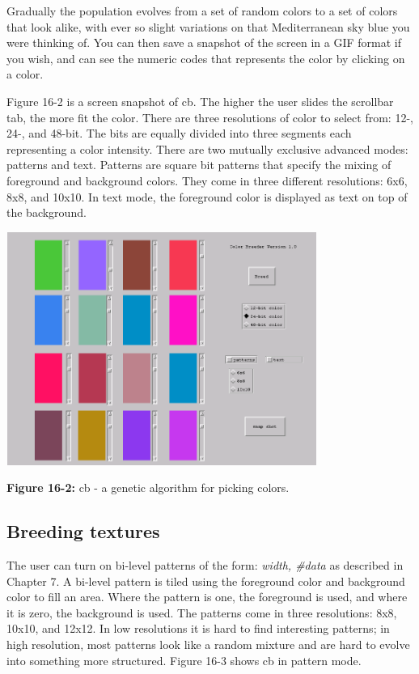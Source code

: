 Gradually the population evolves from a set of random colors to a set of
colors that look alike, with ever so slight variations on that
Mediterranean sky blue you were thinking of. You can then save a
snapshot of the screen in a GIF format if you wish, and can see the
numeric codes that represents the color by clicking on a color.

Figure 16-2 is a screen snapshot of \textsf{cb}. The higher the user
slides the scrollbar tab, the more fit the color. There are three
resolutions of color to select from: 12-, 24-, and 48-bit.
The bits are equally divided into three segments each representing a
color intensity. There are two mutually exclusive advanced modes:
patterns and text. Patterns are square bit patterns that specify the
mixing of foreground and background colors. They come in three
different resolutions: 6x6, 8x8, and 10x10. In text mode, the
foreground color is displayed as text on top of the background.

\begin{center}
\includegraphics[width=4.0in,height=3.0in]{ub-img/ub-img46.png}
\end{center}

{\sffamily\bfseries Figure 16-2:}
{\sffamily cb - a genetic algorithm for picking colors.}



\subsection{Breeding textures}

The user can turn on bi-level patterns of the form: \textit{width,
\#data} as described in Chapter 7. A bi-level pattern is tiled using
the foreground color and background color to fill an area. Where the
pattern is one, the foreground is used, and where it is zero, the
background is used. The patterns come in three resolutions: 8x8, 10x10,
and 12x12. In low resolutions it is hard to find interesting patterns;
in high resolution, most patterns look like a random mixture and are
hard to evolve into something more structured. Figure 16-3 shows
\textsf{cb} in pattern mode.

